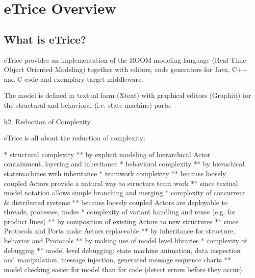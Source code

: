 
\section{eTrice Overview}

\subsection{What is eTrice?}

eTrice provides an implementation of the ROOM modeling language (Real Time Object Oriented Modeling) together with editors, code generators for Java, C++ and C code and exemplary target middleware.

The model is defined in textual form (Xtext) with graphical editors (Graphiti) for the structural and behavioral (i.e. state machine) parts.  

h2. Reduction of Complexity

eTrice is all about the reduction of complexity:

* structural complexity
** by explicit modeling of hierarchical Actor containment, layering and inheritance
* behavioral complexity
** by hierachical statemachines with inheritance
* teamwork complexity
** because loosely coupled Actors provide a natural way to structure team work
** since textual model notation allows simple branching and merging
* complexity of concurrent & distributed systems
** because loosely coupled Actors are deployable to threads, processes, nodes
* complexity of variant handling and reuse (e.g. for product lines)
** by composition of existing Actors to new structures
** since Protocols and Ports make Actors replaceable
** by inheritance for structure, behavior and Protocols
** by making use of model level libraries
* complexity of debugging
** model level debugging: state machine animation, data inspection and manipulation, message injection, generated message sequence charts
** model checking easier for model than for code (detect errors before they occur)

